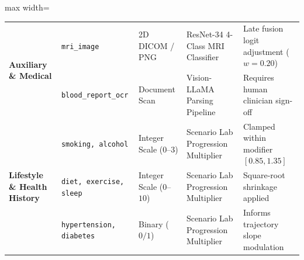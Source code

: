 \begin{table}[t]
\begin{adjustbox}{max width=\linewidth}
\begin{tabular}{p{2.8cm}llp{4.5cm}p{4.2cm}}
\midrule
\multirow{2}{*}{\textbf{Auxiliary \& Medical}}
& \texttt{mri\_image} & 2D DICOM / PNG & ResNet-34 4-Class MRI Classifier & Late fusion logit adjustment ($w=0.20$) \\
& \texttt{blood\_report\_ocr} & Document Scan & Vision-LLaMA Parsing Pipeline & Requires human clinician sign-off \\
\midrule
\multirow{3}{*}{\textbf{Lifestyle \& Health History}}
& \texttt{smoking, alcohol} & Integer Scale ($0$--$3$) & Scenario Lab Progression Multiplier & Clamped within modifier $[0.85, 1.35]$ \\
& \texttt{diet, exercise, sleep}& Integer Scale ($0$--$10$) & Scenario Lab Progression Multiplier & Square-root shrinkage applied \\
& \texttt{hypertension, diabetes}& Binary ($0/1$) & Scenario Lab Progression Multiplier & Informs trajectory slope modulation \\
\bottomrule
\end{tabular}
\end{adjustbox}
\end{table}
